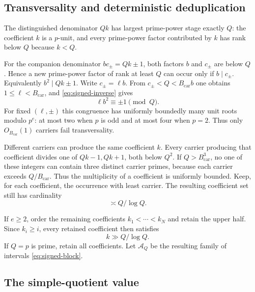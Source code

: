 \subsection{Transversality and deterministic deduplication}

The distinguished denominator $Qk$ has largest prime-power stage exactly $Q$: the coefficient $k$ is a $p$-unit, and every prime-power factor contributed by $k$ has rank below $Q$ because $k<Q$.

For the companion denominator $bc_\pm=Qk\pm1$, both factors $b$ and $c_\pm$ are below $Q$.  Hence a new prime-power factor of rank at least $Q$ can occur only if $b\mid c_\pm$.  Equivalently $b^2\mid Qk\pm1$.  Write $c_\pm=\ell b$.  From $c_\pm<Q<B_{\mathrm{car}}b$ one obtains $1\le\ell<B_{\mathrm{car}}$, and \eqref{eq:signed-inverse} gives
\begin{equation}\label{eq:bad-carrier}
\ell b^2\equiv\pm1\pmod Q.
\end{equation}
For fixed $(\ell,\pm)$ this congruence has uniformly boundedly many unit roots modulo $p^e$: at most two when $p$ is odd and at most four when $p=2$.  Thus only $O_{B_{\mathrm{car}}}(1)$ carriers fail transversality.

Different carriers can produce the same coefficient $k$.  Every carrier producing that coefficient divides one of $Qk-1,Qk+1$, both below $Q^2$.  If $Q>B_{\mathrm{car}}^3$, no one of these integers can contain three distinct carrier primes, because each carrier exceeds $Q/B_{\mathrm{car}}$.  Thus the multiplicity of a coefficient is uniformly bounded.  Keep, for each coefficient, the occurrence with least carrier.  The resulting coefficient set still has cardinality
\[
\asymp Q/\log Q.
\]

If $e\ge2$, order the remaining coefficients $k_1<\cdots<k_N$ and retain the upper half.  Since $k_i\ge i$, every retained coefficient then satisfies
\begin{equation}\label{eq:coef-lower}
k\gg Q/\log Q.
\end{equation}
If $Q=p$ is prime, retain all coefficients.  Let $\mathcal A_Q$ be the resulting family of intervals \eqref{eq:signed-block}.

\subsection{The simple-quotient value}

